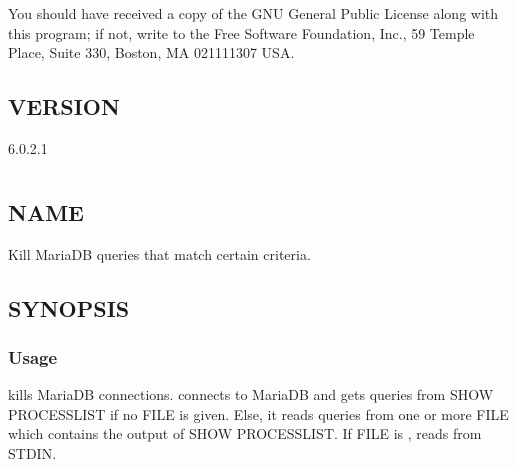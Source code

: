 \documentclass[letterpaper,10pt,english]{sphinxmanual}
\begin{document}
You should have received a copy of the GNU General Public License along with
this program; if not, write to the Free Software Foundation, Inc., 59 Temple
Place, Suite 330, Boston, MA  02111\sphinxhyphen{}1307  USA.


\section{VERSION}
\label{\detokenize{mariadb-iostat:version}}
 6.0.2.1


\chapter{}
\label{\detokenize{mariadb-kill:mariadb-kill}}\label{\detokenize{mariadb-kill::doc}}

\section{NAME}
\label{\detokenize{mariadb-kill:name}}
 \sphinxhyphen{} Kill MariaDB queries that match certain criteria.


\section{SYNOPSIS}
\label{\detokenize{mariadb-kill:synopsis}}

\subsection{Usage}
\label{\detokenize{mariadb-kill:usage}}
\begin{sphinxVerbatim}[commandchars=\\\{\}]
 \PYG{p}{[}\PYG{p}{]} \PYG{p}{[}\PYG{p}{]}
\end{sphinxVerbatim}

 kills MariaDB connections.   connects to MariaDB and gets queries
from SHOW PROCESSLIST if no FILE is given.  Else, it reads queries from one
or more FILE which contains the output of SHOW PROCESSLIST.  If FILE is \sphinxhyphen{},
 reads from STDIN.
\end{document}
